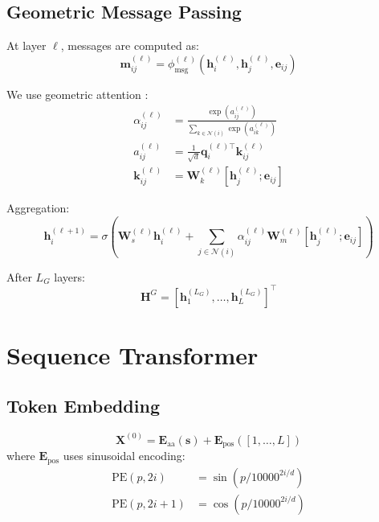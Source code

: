 \documentclass[11pt]{article}
\begin{document}
\subsection{Geometric Message Passing}

At layer $\ell$, messages are computed as:
\begin{equation}
    \mathbf{m}_{ij}^{(\ell)} = \phi_{\text{msg}}^{(\ell)}(\mathbf{h}_i^{(\ell)}, \mathbf{h}_j^{(\ell)}, \mathbf{e}_{ij})
\end{equation}

We use geometric attention \citep{jing2021learning}:
\begin{align}
    \alpha_{ij}^{(\ell)} &= \frac{\exp(a_{ij}^{(\ell)})}{\sum_{k \in \mathcal{N}(i)} \exp(a_{ik}^{(\ell)})} \\
    a_{ij}^{(\ell)} &= \frac{1}{\sqrt{d}} \mathbf{q}_i^{(\ell)\top} \mathbf{k}_{ij}^{(\ell)} \\
    \mathbf{k}_{ij}^{(\ell)} &= \mathbf{W}_k^{(\ell)} [\mathbf{h}_j^{(\ell)}; \mathbf{e}_{ij}]
\end{align}

Aggregation:
\begin{equation}
    \mathbf{h}_i^{(\ell+1)} = \sigma\left(\mathbf{W}_s^{(\ell)} \mathbf{h}_i^{(\ell)} + \sum_{j \in \mathcal{N}(i)} \alpha_{ij}^{(\ell)} \mathbf{W}_m^{(\ell)} [\mathbf{h}_j^{(\ell)}; \mathbf{e}_{ij}] \right)
\end{equation}

After $L_G$ layers:
\begin{equation}
    \mathbf{H}^G = [\mathbf{h}_1^{(L_G)}, \ldots, \mathbf{h}_L^{(L_G)}]^\top
\end{equation}


\section{Sequence Transformer}

\subsection{Token Embedding}

\begin{equation}
    \mathbf{X}^{(0)} = \mathbf{E}_{\text{aa}}(\mathbf{s}) + \mathbf{E}_{\text{pos}}([1, \ldots, L])
\end{equation}
where $\mathbf{E}_{\text{pos}}$ uses sinusoidal encoding:
\begin{align}
    \text{PE}(p, 2i) &= \sin(p / 10000^{2i/d}) \\
    \text{PE}(p, 2i+1) &= \cos(p / 10000^{2i/d})
\end{align}
\end{document}
